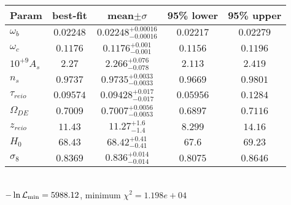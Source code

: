 \begin{tabular}{|l|c|c|c|c|} 
 \hline 
Param & best-fit & mean$\pm\sigma$ & 95\% lower & 95\% upper \\ \hline 
$\omega_b$ &$0.02248$ & $0.02248_{-0.00016}^{+0.00016}$ & $0.02217$ & $0.02279$ \\ 
$\omega_c$ &$0.1176$ & $0.1176_{-0.001}^{+0.001}$ & $0.1156$ & $0.1196$ \\ 
$10^{+9}A_{s }$ &$2.27$ & $2.266_{-0.078}^{+0.076}$ & $2.113$ & $2.419$ \\ 
$n_{s }$ &$0.9737$ & $0.9735_{-0.0033}^{+0.0033}$ & $0.9669$ & $0.9801$ \\ 
$\tau_{reio }$ &$0.09574$ & $0.09428_{-0.017}^{+0.017}$ & $0.05956$ & $0.1284$ \\ 
$\Omega_{DE}$ &$0.7009$ & $0.7007_{-0.0053}^{+0.0056}$ & $0.6897$ & $0.7116$ \\ 
$z_{reio }$ &$11.43$ & $11.27_{-1.4}^{+1.6}$ & $8.299$ & $14.16$ \\ 
$H_{0 }$ &$68.43$ & $68.42_{-0.41}^{+0.41}$ & $67.6$ & $69.23$ \\ 
$\sigma_8$ &$0.8369$ & $0.836_{-0.014}^{+0.014}$ & $0.8075$ & $0.8646$ \\ 
\hline 
 \end{tabular} \\ 
$-\ln{\cal L}_\mathrm{min} =5988.12$, minimum $\chi^2=1.198e+04$ \\ 
